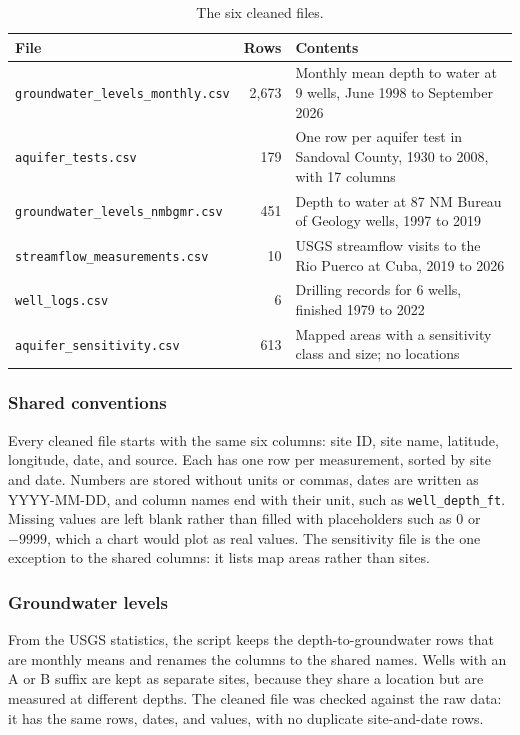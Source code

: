\documentclass[10pt,twocolumn,letterpaper]{article}
\begin{document}
\begin{table}[t]
  \caption{The six cleaned files.}
  \label{tab:cleaned}
  \footnotesize
  \begin{tabularx}{\linewidth}{@{}>{\raggedright}p{1.15in}r>{\raggedright\arraybackslash}X@{}}
    \toprule
    \textbf{File} & \textbf{Rows} & \textbf{Contents} \\
    \midrule
    \texttt{groundwater\_\allowbreak{}levels\_\allowbreak{}monthly.csv} & 2,673 & Monthly mean depth to water at
      9 wells, June 1998 to September 2026 \\
    \texttt{aquifer\_\allowbreak{}tests.csv} & 179 & One row per aquifer test in Sandoval County, 1930 to
      2008, with 17 columns \\
    \texttt{groundwater\_\allowbreak{}levels\_\allowbreak{}nmbgmr.csv} & 451 & Depth to water at 87 NM Bureau of Geology
      wells, 1997 to 2019 \\
    \texttt{streamflow\_\allowbreak{}measurements.csv} & 10 & USGS streamflow visits to the Rio Puerco at Cuba,
      2019 to 2026 \\
    \texttt{well\_\allowbreak{}logs.csv} & 6 & Drilling records for 6 wells, finished 1979 to 2022 \\
    \texttt{aquifer\_\allowbreak{}sensitivity.csv} & 613 & Mapped areas with a sensitivity class and size; no
      locations \\
    \bottomrule
  \end{tabularx}
\end{table}

\subsubsection{Shared conventions}
Every cleaned file starts with the same six columns: site ID, site name, latitude, longitude,
date, and source. Each has one row per measurement, sorted by site and date. Numbers are stored
without units or commas, dates are written as \mbox{YYYY-MM-DD}, and column names end with their unit,
such as \texttt{well\_depth\_ft}. Missing values are left blank rather than filled with
placeholders such as 0 or $-9999$, which a chart would plot as real values. The sensitivity file
is the one exception to the shared columns: it lists map areas rather than sites.

\subsubsection{Groundwater levels}
From the USGS statistics, the script keeps the depth-to-groundwater rows that are monthly means
and renames the columns to the shared names. Wells with an A or B suffix are kept as separate
sites, because they share a location but are measured at different depths. The cleaned file was
checked against the raw data: it has the same rows, dates, and values, with no duplicate
site-and-date rows.
\end{document}
